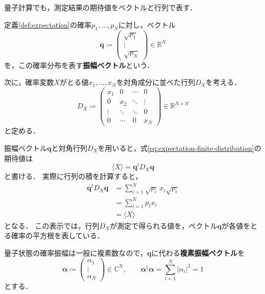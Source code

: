 量子計算でも，測定結果の期待値をベクトルと行列で表す．

\begin{defi}[振幅ベクトル]
  \label{def:classical-amplitude-vector}
  定義\ref{def:expectation}の確率$p_1,\ldots,p_N$に対し，ベクトル
  \begin{equation}
    \bm{q}\coloneq
    \begin{pmatrix}
      \sqrt{p_1} \\
      \vdots     \\
      \sqrt{p_N}
    \end{pmatrix}
    \in\mathbb R^N
    \label{eq:classical-amplitude-vector}
  \end{equation}
  を，この確率分布を表す\textbf{振幅ベクトル}という．
\end{defi}

次に，確率変数$X$がとる値$x_1,\ldots,x_N$を対角成分に並べた行列$D_X$を考える．
\begin{equation}
  D_X\coloneq
  \begin{pmatrix}
    x_1    & 0      & \cdots & 0      \\
    0      & x_2    & \ddots & \vdots \\
    \vdots & \ddots & \ddots & 0      \\
    0      & \cdots & 0      & x_N
  \end{pmatrix}
  \in\mathbb R^{N\times N}
  \label{eq:classical-observable-diagonal-matrix}
\end{equation}
と定める．

振幅ベクトル$\bm{q}$と対角行列$D_X$を用いると，式\eqref{eq:expectation-finite-distribution}の期待値は
\begin{equation}
  \langle X\rangle=\bm{q}^t D_X \bm{q}
  \label{eq:classical-expectation-matrix-form}
\end{equation}
と書ける．
実際に行列の積を計算すると，
\begin{equation*}
  \begin{aligned}
    \bm{q}^t D_X \bm{q}
     & =\sum_{i=1}^{N}\sqrt{p_i}\,x_i\sqrt{p_i} \\
     & =\sum_{i=1}^{N}p_i x_i                   \\
     & =\langle X\rangle
  \end{aligned}
\end{equation*}
となる．
この表示では，行列$D_X$が測定で得られる値を，ベクトル$\bm{q}$が各値をとる確率の平方根を表している．

量子状態の確率振幅は一般に複素数なので，$\bm{q}$に代わる\textbf{複素振幅ベクトル}を
\begin{equation}
  \bm{\alpha}\coloneq
  \begin{pmatrix}\alpha_1\\\vdots\\\alpha_N\end{pmatrix}
  \in\mathbb C^N,
  \qquad
  \bm{\alpha}^{\dagger}\bm{\alpha}
  =\sum_{i=1}^{N}|\alpha_i|^2=1
  \label{eq:complex-amplitude-vector}
\end{equation}
とする．

